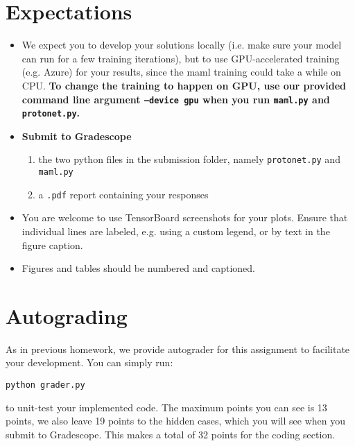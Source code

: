 \documentclass[12pt]{article}
\begin{document}
\section*{Expectations}
\begin{itemize}
    \item We expect you to develop your solutions locally (i.e. make sure your model can run for a few training iterations), but to use GPU-accelerated training (e.g. Azure) for your results, since the maml training could take a while on CPU. \textbf{To change the training to happen on GPU, use our provided command line argument \texttt{--device gpu} when you run \texttt{maml.py} and \texttt{protonet.py}.}
    \item \textbf{Submit to Gradescope}
    \begin{enumerate}
        \item the two python files in the submission folder, namely \texttt{protonet.py} and \texttt{maml.py}
        \item a \texttt{.pdf} report containing your responses
    \end{enumerate}
    \item You are welcome to use TensorBoard screenshots for your plots. Ensure that individual lines are labeled, e.g. using a custom legend, or by text in the figure caption.
    \item Figures and tables should be numbered and captioned.
\end{itemize}

\section*{Autograding}
As in previous homework, we provide autograder for this assignment to facilitate your development. You can simply run:

\texttt{python grader.py}

to unit-test your implemented code. The maximum points you can see is 13 points, we also leave 19 points to the hidden cases, which you will see when you submit to Gradescope. This makes a total of 32 points for the coding section.
\newpage
\end{document}
